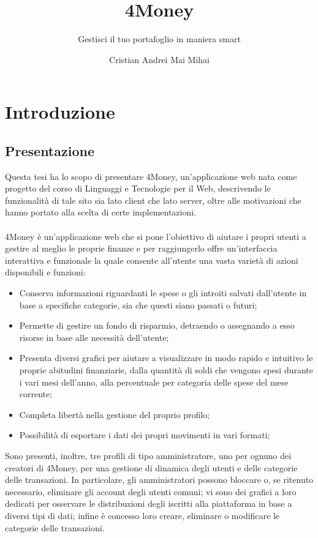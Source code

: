 \documentclass[binding=0.6cm, oneside, noexaminfo, italian]{sapthesis}
\title{4Money}
\subtitle{Gestisci il tuo portafoglio in maniera smart}
\author{Cristian Andrei Mai Mihai}
\newcommand\blankpage{%
    \null
    \thispagestyle{empty}%
    \addtocounter{page}{-1}%
    \newpage}
\begin{document}
\frontmatter
\maketitle

\afterpage{\blankpage}

\newpage

\tableofcontents

\mainmatter
\newpage

\section{Introduzione}
\subsection{Presentazione}
Questa tesi ha lo scopo di presentare 4Money, un’applicazione web nata come progetto del corso di Linguaggi e Tecnologie per il Web, descrivendo le funzionalità di tale sito sia lato client che lato server, oltre alle motivazioni che hanno portato alla scelta di certe implementazioni. \\ \\
4Money è un’applicazione web che si pone l’obiettivo di aiutare i propri utenti a gestire al meglio le proprie finanze e per raggiungerlo offre un’interfaccia interattiva e funzionale la quale consente all’utente una vasta varietà di azioni disponibili e funzioni:
\begin{itemize}
    \item Conserva informazioni riguardanti le spese o gli introiti salvati dall’utente in base a specifiche categorie, sia che questi siano passati o futuri;
    \item Permette di gestire un fondo di risparmio, detraendo o assegnando a esso risorse in base alle necessità dell’utente;
    \item Presenta diversi grafici per aiutare a visualizzare in modo rapido e intuitivo le proprie abitudini finanziarie, dalla quantità di soldi che vengono spesi durante i vari mesi dell’anno, alla percentuale per categoria delle spese del mese corrente;
    \item Completa libertà nella gestione del proprio profilo;
    \item Possibilità di esportare i dati dei propri movimenti in vari formati;
\end{itemize}
Sono presenti, inoltre, tre profili di tipo amministratore, uno per ognuno dei creatori di 4Money, per una gestione di dinamica degli utenti e delle categorie delle transazioni. In particolare, gli amministratori possono bloccare o, se ritenuto necessario, eliminare gli account degli utenti comuni; vi sono dei grafici a loro dedicati per osservare le distribuzioni degli iscritti alla piattaforma in base a diversi tipi di dati; infine è concesso loro creare, eliminare o modificare le categorie delle transazioni.
\end{document}
